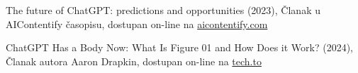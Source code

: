 \documentclass[fleqn, 12pt]{article}
\begin{document}
{\begin{thebibliography}{9}
     The future of ChatGPT: predictions and opportunities (2023), Članak u AIContentify časopisu, dostupan on-line na \href{https://aicontentfy.com/en/blog/future-of-chatgpt-predictions-and-opportunities}{aicontentify.com}
    
     ChatGPT Has a Body Now: What Is Figure 01 and How Does it Work? (2024), Članak autora Aaron Drapkin, dostupan on-line na \href{https://tech.co/news/what-is-figure-01-chatgpt}{tech.to}
\end{thebibliography}
}
\end{document}

